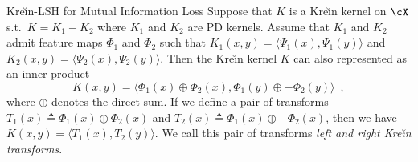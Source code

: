 \documentclass[final]{beamer}
\newcommand{\kr}{Kre\u{\i}n\xspace}
\DeclareMathOperator{\sech}{sech}
\newlength{\threecolwid}
\begin{document}
\begin{frame}[t]
\begin{columns}[t]
\begin{column}{\threecolwid}
\begin{block}{\kr-LSH for Mutual Information Loss}
 		 Suppose that $ K $ 
 		is a 
 		\kr kernel on $ \cX $ s.t.\ $ K=K_1-K_2 $ where $ K_1 $ and $ K_2 $ 
 		are 
 		PD kernels. 
 		 Assume that $ K_1 $ and $ K_2$ 
 		admit 
 		feature maps $ \Phi_1 $ and $\Phi_2 $ such that $ K_1(x,y)=\langle 
 		\Psi_1(x),\Psi_1(y)\rangle $ and $ K_2(x,y)=\langle 
 		\Psi_2(x),\Psi_2(y)\rangle 
 		$. Then the \kr kernel $ K $ can also represented as an inner product 
 		\begin{equation}\label{eq:krein_inner_product}
 		K(x,y)=\langle \Phi_1(x)\oplus \Phi_2(x), \Phi_1(y)\oplus 
 		-\Phi_2(y)\rangle\enspace,
 		\end{equation}
 		where $ \oplus $ denotes the direct sum. If we define a pair of 
 		transforms $ 
 		T_1(x) \triangleq \Phi_1(x)\oplus \Phi_2(x)
 		$ and $ T_2(x)\triangleq \Phi_1(x)\oplus -\Phi_2(x)
 		$,
 		then we have $
 		K(x,y)=\langle T_1(x),T_2(y)\rangle
 		$.
 		We call this pair of transforms \emph{left and right \kr transforms}.
% 		

\end{block}
\end{column}
\end{columns}
\end{frame}
\end{document}
